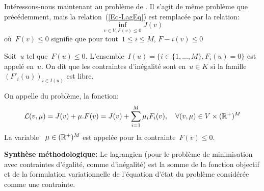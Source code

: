 \medskip
Intéressons-nous maintenant au problème de .
Il s'agit de même problème que précédemment, mais la relation~(\ref{Eq-LagEq}) est remplacée par la relation:
\begin{equation}\label{Eq-LagIneq}
\inf_{v\in V, F(v)\le0} J(v)
\end{equation}
où~$F(v)\le0$ signifie que pour tout~$1\le i\le M$, $F-i(v)\le0$

\begin{definition}
Soit~$u$ tel que~$F(u)\le0$.
L'ensemble~$I(u)=\{i\in\{1, ..., M\}, F_i(u)=0\}$ est appelé  en~$u$.
On dit que les contraintes d'inégalité sont  en~$u\in K$ si la famille~$(F'_i(u))_{i\in I(u)}$ est libre.
\end{definition}

\begin{definition}
On appelle  du problème, la fonction:
\begin{equation}
\mathcal{L}(v,\mu) = J(v)+\mu.F(v) = J(v) + \displaystyle\sum_{i=1}^M \mu_iF_i(v), 
\quad \forall (v,\mu)\in V\times(\mathbb R^+)^M
\end{equation}
La variable ~$\mu\in(\mathbb R^+)^M$ est appelée  pour la contrainte~$F(v)\le0$.
\end{definition}

\noindent\textbf{Synthèse méthodologique:} Le lagrangien (pour le problème de minimisation avec contraintes d'égalité, comme d'inégalité) est la somme de la fonction objectif et de la formulation variationnelle de l'équation d'état du problème considérée comme une contrainte.

